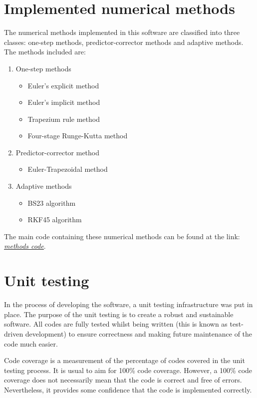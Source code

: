 \section{Implemented numerical methods}
\label{sec:implemented-methods}
The numerical methods implemented in this software are classified into three classes: one-step methods, predictor-corrector methods and adaptive methods. The methods included are:
\begin{enumerate}
    \item One-step methods
    \begin{itemize}
        \item Euler's explicit method
        \item Euler's implicit method
        \item Trapezium rule method
        \item Four-stage Runge-Kutta method
    \end{itemize}
    \item Predictor-corrector method
    \begin{itemize}
        \item Euler-Trapezoidal method
    \end{itemize}
    \item Adaptive methods
    \begin{itemize}
        \item BS23 algorithm
        \item RKF45 algorithm
    \end{itemize}
\end{enumerate}

The main code containing these numerical methods can be found at the link: \href{https://github.com/FarmHJ/numerical-solver/blob/main/solver/methods.py}{\underline{\emph{methods code}}}.

\section{Unit testing}
\label{sec:testing}
In the process of developing the software, a unit testing infrastructure was put in place. The purpose of the unit testing is to create a robust and sustainable software. All codes are fully tested whilst being written (this is known as test-driven development) to ensure correctness and making future maintenance of the code much easier.

Code coverage is a measurement of the percentage of codes covered in the unit testing process. It is usual to aim for 100\% code coverage. However, a 100\% code coverage does not necessarily mean that the code is correct and free of errors. Nevertheless, it provides some confidence that the code is implemented correctly.

